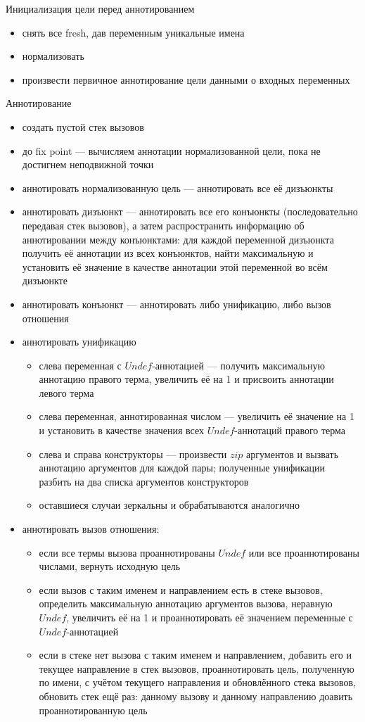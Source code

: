 \documentclass[conference]{IEEEtran}
\begin{document}
Инициализация цели перед аннотированием
\begin{itemize}
    \item снять все fresh, дав переменным уникальные имена 
    \item нормализовать
    \item произвести первичное аннотирование цели данными о входных переменных
\end{itemize}

Аннотирование
\begin{itemize}
    \item создать пустой стек вызовов
    \item до fix point --- вычисляем аннотации нормализованной цели, пока не достигнем неподвижной точки
    \item аннотировать нормализованную цель --- аннотировать все её дизъюнкты
    \item аннотировать дизъюнкт --- аннотировать все его конъюнкты (последовательно передавая стек вызовов), а затем распространить информацию об аннотировании между конъюнктами: для каждой переменной дизъюнкта получить её аннотации из всех конъюнктов, найти максимальную и установить её значение в качестве аннотации этой переменной во всём дизъюнкте
    \item аннотировать конъюнкт --- аннотировать либо унификацию, либо вызов отношения
    \item аннотировать унификацию
    \begin{itemize}
        \item слева переменная с $Undef$-аннотацией --- получить максимальную аннотацию правого терма, увеличить её на 1 и присвоить аннотации левого терма
        \item слева переменная, аннотированная числом --- увеличить её значение на 1 и установить в качестве значения всех $Undef$-аннотаций правого терма
        \item слева и справа конструкторы --- произвести $zip$ аргументов и вызвать аннотацию аргументов для каждой пары; полученные унификации разбить на два списка аргументов конструкторов
        \item оставшиеся случаи зеркальны и обрабатываются аналогично
    \end{itemize}
    \item аннотировать вызов отношения:
    \begin{itemize}
        \item если все термы вызова проаннотированы $Undef$ или все проаннотированы числами, вернуть исходную цель
        \item если вызов с таким именем и направлением есть в стеке вызовов, определить максимальную аннотацию аргументов вызова, неравную $Undef$, увеличить её на 1 и проаннотировать её значением переменные с $Undef$-аннотацией
        \item если в стеке нет вызова с таким именем и направлением, добавить его и текущее направление в стек вызовов, проаннотировать цель, полученную по имени, с учётом текущего направления и обновлённого стека вызовов, обновить стек ещё раз: данному вызову и данному направлению доавить проаннотированную цель
    \end{itemize}
\end{itemize}
\end{document}
